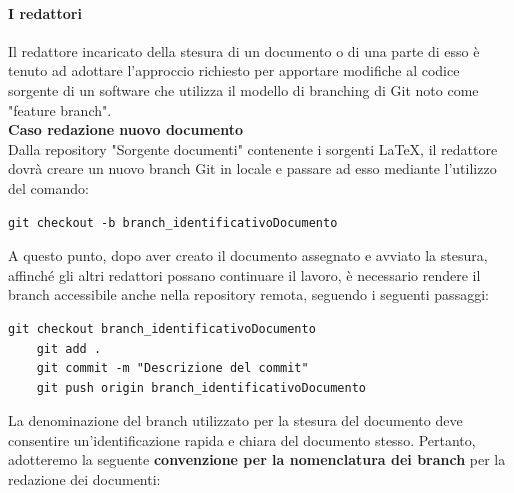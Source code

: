 \documentclass{article}
\begin{document}
    

    \paragraph{I redattori}

    Il redattore incaricato della stesura di un documento o di una parte di esso è tenuto ad adottare l'approccio richiesto per apportare modifiche al codice sorgente di un software che utilizza il modello di branching di Git noto come "feature branch".\\
    \vspace{0.1cm}
    \textbf{Caso redazione nuovo documento}\\
Dalla repository  "Sorgente documenti" contenente i sorgenti \LaTeX, il redattore dovrà creare un nuovo branch Git in locale e passare ad esso mediante l'utilizzo del comando:

    \begin{lstlisting}[style=code]
    git checkout -b branch_identificativoDocumento 
    \end{lstlisting}

    A questo punto, dopo aver creato il documento assegnato e avviato la stesura, affinché gli altri redattori possano continuare il lavoro, è necessario rendere il branch accessibile anche nella repository remota, seguendo i seguenti passaggi:        
        \begin{lstlisting}[style=code]
    git checkout branch_identificativoDocumento 
    git add .
    git commit -m "Descrizione del commit"
    git push origin branch_identificativoDocumento
        \end{lstlisting}
    La denominazione del branch utilizzato per la stesura del documento deve consentire un'identificazione rapida e chiara del documento stesso. Pertanto, adotteremo la seguente \textbf{convenzione per la nomenclatura dei branch} per la redazione dei documenti:
\end{document}
